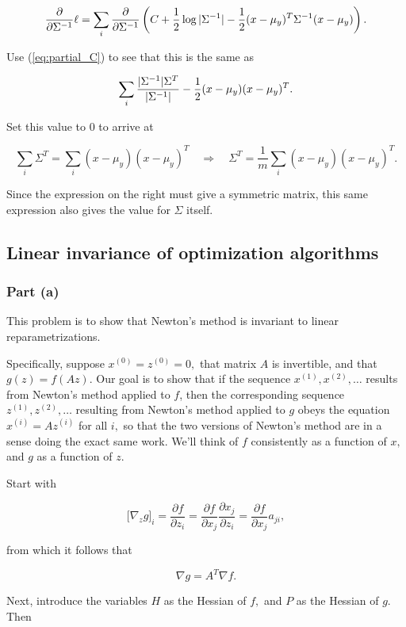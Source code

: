 \documentclass[]{article}
\begin{document}
\[\frac{\partial}{\partial \Sigma^{-1}}\ell = \sum_i\frac{\partial}{\partial \Sigma^{-1}}\left(C + \frac{1}{2}\log |\Sigma^{-1}| -
\frac{1}{2}(x-\mu_y)^T\Sigma^{-1}(x-\mu_y)\right).\]

Use (\ref{eq:partial_C}) to see that this is the same as

\[\sum_i \frac{|\Sigma^{-1}|\Sigma^T}{|\Sigma^{-1}|} - \frac{1}{2}(x-\mu_y)(x-\mu_y)^T.\]

Set this value to 0 to arrive at

\[\sum_i \Sigma^T = \sum_i (x-\mu_y)(x-\mu_y)^T
\quad\Rightarrow\quad
\Sigma^T = \frac{1}{m}\sum_i (x-\mu_y)(x-\mu_y)^T.\]

Since the expression on the right must give a symmetric matrix, this
same expression also gives the value for \(\Sigma\) itself.

\subsection{Linear invariance of optimization
algorithms}\label{linear-invariance-of-optimization-algorithms}

\subsubsection{Part (a)}\label{part-a-3}

This problem is to show that Newton's method is invariant to linear
reparametrizations.

Specifically, suppose \(x^{(0)} = z^{(0)} = 0,\) that matrix \(A\) is
invertible, and that \(g(z) = f(Az).\) Our goal is to show that if the
sequence \(x^{(1)}, x^{(2)}, \ldots\) results from Newton's method
applied to \(f\), then the corresponding sequence
\(z^{(1)}, z^{(2)}, \ldots\) resulting from Newton's method applied to
\(g\) obeys the equation \(x^{(i)} = Az^{(i)}\) for all \(i,\) so that
the two versions of Newton's method are in a sense doing the exact same
work. We'll think of \(f\) consistently as a function of \(x,\) and
\(g\) as a function of \(z.\)

\newcommand{\pdd}[2]{\frac{\partial #1}{\partial #2}}

Start with

\[\big[\nabla_z g\big]_i = \pdd{f}{z_i} = \pdd{f}{x_j}\pdd{x_j}{z_i}
= \pdd{f}{x_j}a_{ji},\]

from which it follows that

\[\nabla g = A^T\nabla f.\]

Next, introduce the variables \(H\) as the Hessian of \(f,\) and \(P\)
as the Hessian of \(g.\) Then
\end{document}
